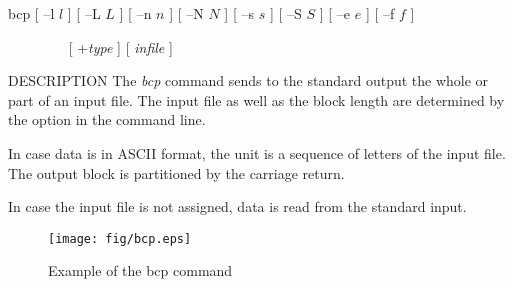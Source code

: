 
\begin{synopsis}
\item[bcp] [ --l $l$ ]  [ --L $L$ ]  [ --n $n$ ]  [ --N $N$ ]
           [ --s $s$ ]  [ --S $S$ ]  [ --e $e$ ]  [ --f $f$ ]
\item[\ ~~~~~~~] [ +{\em type} ] [ {\em infile} ] 
\end{synopsis}

\begin{qsection}{DESCRIPTION}
The {\em bcp} command sends to the standard output
the whole or part of an input file.
The input file as well as the block length are determined by
the option in the command line.
\par
In case data is in ASCII format, the unit is
a sequence of letters of the input file.
The output block is partitioned by the carriage return.
\par
In case the input file is not assigned,
data is read from the standard input.
\end{qsection}

\begin{center}
\leavevmode
\begin{figure}[h]
\texttt{[image: fig/bcp.eps]}
\caption{Example of the bcp command}
\end{figure}
\end{center}

\begin{options}
\end{options}

